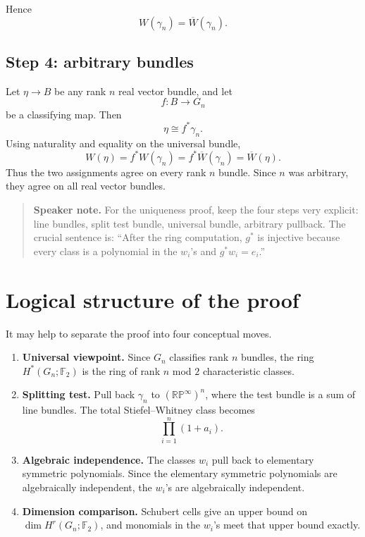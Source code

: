 \documentclass[11pt]{article}
\theoremstyle{remark}
\newcommand{\F}{\mathbb F}
\newcommand{\RP}{\mathbb{RP}}
\newcommand{\Gn}{G_n}
\newcommand{\gamman}{\gamma_n}
\newcommand{\olW}{\overline{W}}
\newenvironment{talknote}{\begin{quote}\small\textbf{Speaker note.} }{\end{quote}}
\begin{document}
Hence
\[
  W(\gamman)=\olW(\gamman).
\]

\subsection{Step 4: arbitrary bundles}

Let $\eta\to B$ be any rank $n$ real vector bundle, and let
\[
  f:B\to \Gn
\]
be a classifying map.  Then
\[
  \eta\cong f^*\gamman.
\]
Using naturality and equality on the universal bundle,
\[
  W(\eta)=f^*W(\gamman)=f^*\olW(\gamman)=\olW(\eta).
\]
Thus the two assignments agree on every rank $n$ bundle.  Since $n$ was arbitrary, they agree on all real vector bundles.

\begin{talknote}
For the uniqueness proof, keep the four steps very explicit: line bundles, split test bundle, universal bundle, arbitrary pullback.  The crucial sentence is: ``After the ring computation, $g^*$ is injective because every class is a polynomial in the $w_i$'s and $g^*w_i=e_i$.''
\end{talknote}

\section{Logical structure of the proof}

It may help to separate the proof into four conceptual moves.

\begin{enumerate}
\item \textbf{Universal viewpoint.}  Since $\Gn$ classifies rank $n$ bundles, the ring $H^*(\Gn;\F_2)$ is the ring of rank $n$ mod $2$ characteristic classes.

\item \textbf{Splitting test.}  Pull back $\gamman$ to $(\RP^\infty)^n$, where the test bundle is a sum of line bundles.  The total Stiefel--Whitney class becomes
\[
  \prod_{i=1}^n(1+a_i).
\]

\item \textbf{Algebraic independence.}  The classes $w_i$ pull back to elementary symmetric polynomials.  Since the elementary symmetric polynomials are algebraically independent, the $w_i$'s are algebraically independent.

\item \textbf{Dimension comparison.}  Schubert cells give an upper bound on $\dim H^r(\Gn;\F_2)$, and monomials in the $w_i$'s meet that upper bound exactly.
\end{enumerate}
\end{document}
